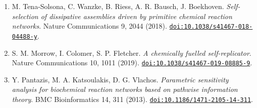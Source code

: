 \documentclass[
  11pt,
]{article}
\begin{document}
\begin{enumerate}
{  relations in chemical reaction networks}. Journal of Chemical Physics
  149, 245101 (2018).
  \href{https://doi.org/10.1063/1.5042253}{\nolinkurl{doi:10.1063/1.5042253}}.
\item
  M. Tena-Solsona, C. Wanzke, B. Riess, A. R. Bausch, J. Boekhoven.
  \emph{Self-selection of dissipative assemblies driven by primitive
  chemical reaction networks}. Nature Communications 9, 2044 (2018).
  \href{https://doi.org/10.1038/s41467-018-04488-y}{\nolinkurl{doi:10.1038/s41467-018-04488-y}}.
\item
  S. M. Morrow, I. Colomer, S. P. Fletcher. \emph{A chemically fuelled
  self-replicator}. Nature Communications 10, 1011 (2019).
  \href{https://doi.org/10.1038/s41467-019-08885-9}{\nolinkurl{doi:10.1038/s41467-019-08885-9}}.
\item
  Y. Pantazis, M. A. Katsoulakis, D. G. Vlachos. \emph{Parametric
  sensitivity analysis for biochemical reaction networks based on
  pathwise information theory}. BMC Bioinformatics 14, 311 (2013).
  \href{https://doi.org/10.1186/1471-2105-14-311}{\nolinkurl{doi:10.1186/1471-2105-14-311}}.
\end{enumerate}
\end{document}
